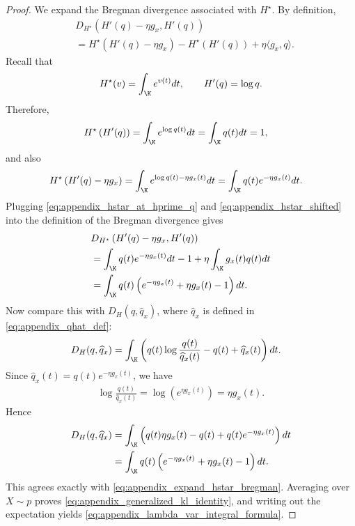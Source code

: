 \begin{proof}
We expand the Bregman divergence associated with $H^\star$.
By definition,
\begin{align*}
     & D_{H^\star}\left(H'(q)-\eta g_x, H'(q)\right) \\
     & = H^\star\left(H'(q)-\eta g_x\right) - H^\star\left(H'(q)\right) + \eta \langle g_x, q\rangle.
\end{align*}
Recall that
\begin{align*}
    H^\star(v) = \int_\K e^{v(t)}dt,
    \qquad
    H'(q) = \log q.
\end{align*}
Therefore,
\begin{align}
    H^\star\left(H'(q)\right)
     & = \int_\K e^{\log q(t)}dt
    = \int_\K q(t)dt
    = 1,
    \label{eq:appendix_hstar_at_hprime_q}
\end{align}
and also
\begin{align}
    H^\star\left(H'(q)-\eta g_x\right)
     & = \int_\K e^{\log q(t)-\eta g_x(t)}dt
    = \int_\K q(t)e^{-\eta g_x(t)}dt.
    \label{eq:appendix_hstar_shifted}
\end{align}
Plugging \eqref{eq:appendix_hstar_at_hprime_q} and \eqref{eq:appendix_hstar_shifted} into the definition of the Bregman divergence gives
\begin{align}
     & D_{H^\star}\left(H'(q)-\eta g_x, H'(q)\right) \nonumber \\
     & = \int_\K q(t)e^{-\eta g_x(t)}dt - 1 + \eta \int_\K g_x(t)q(t)dt \nonumber \\
     & = \int_\K q(t)\left(e^{-\eta g_x(t)} + \eta g_x(t) - 1\right)dt.
    \label{eq:appendix_expand_hstar_bregman}
\end{align}
Now compare this with $D_H(q,\widehat q_x)$, where $\widehat q_x$ is defined in \eqref{eq:appendix_qhat_def}:
\begin{align*}
    D_H(q,\widehat q_x)
     & = \int_\K \left(q(t)\log\frac{q(t)}{\widehat q_x(t)} - q(t) + \widehat q_x(t)\right)dt.
\end{align*}
Since $\widehat q_x(t)=q(t)e^{-\eta g_x(t)}$, we have
\begin{align*}
    \log\frac{q(t)}{\widehat q_x(t)}
    = \log\left(e^{\eta g_x(t)}\right)
    = \eta g_x(t).
\end{align*}
Hence
\begin{align*}
    D_H(q,\widehat q_x)
     & = \int_\K \left(q(t)\eta g_x(t) - q(t) + q(t)e^{-\eta g_x(t)}\right)dt \\
     & = \int_\K q(t)\left(e^{-\eta g_x(t)} + \eta g_x(t) - 1\right)dt.
\end{align*}
This agrees exactly with \eqref{eq:appendix_expand_hstar_bregman}. Averaging over $X \sim p$ proves
\eqref{eq:appendix_generalized_kl_identity}, and writing out the expectation yields
\eqref{eq:appendix_lambda_var_integral_formula}.
\end{proof}

